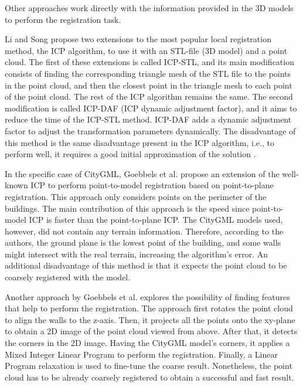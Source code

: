         Other approaches work directly with the information provided in the 3D models to perform the registration task.

        Li and Song \cite{Li_2015_amodified} propose two extensions to the most popular local registration method, the ICP algorithm, 
        to use it with an STL-file (3D model) and a point cloud.
        The first of these extensions is called ICP-STL, and its main modification consists of finding the corresponding triangle mesh of the STL file to the points 
        in the point cloud, and then the closest point in the triangle mesh to each point of the point cloud. The rest of the ICP algorithm remains the same.
        The second modification is called ICP-DAF (ICP dynamic adjustment factor), and it aims to reduce the time of the ICP-STL method. 
        ICP-DAF adds a dynamic adjustment factor to adjust the transformation parameters dynamically.
        The disadvantage of this method is the same disadvantage present in the ICP algorithm, 
        i.e., to perform well, it requires a good initial approximation of the solution \cite{Sakakubara_2007_automatic}.

        In the specific case of CityGML, Goebbels et al. \cite{Goebbels_2019_icpcitygml} propose an extension of the well-known ICP
        to perform point-to-model registration based on point-to-plane registration.
        This approach only considers points on the perimeter of the buildings.
        The main contribution of this approach is the speed since point-to-model ICP is faster than the point-to-plane ICP.
        The CityGML models used, however, did not contain any terrain information.
        Therefore, according to the authors, the ground plane is the lowest point of the building, and some walls might intersect with the real terrain, increasing the algorithm’s error.
        An additional disadvantage of this method is that it expects the point cloud to be coarsely registered with the model.

        Another approach by Goebbels et al. \cite{Goebbels_2018_alinear} explores the possibility of finding features that help to perform the registration.
        The approach first rotates the point cloud to align the walls to the z-axis. Then, it projects all the points onto the 
        xy-plane to obtain a 2D image of the point cloud viewed from above. After that, it detects the corners in the 2D image.
        Having the CityGML model’s corners, it applies a Mixed Integer Linear Program to perform the registration.
        Finally, a Linear Program relaxation is used to fine-tune the coarse result. 
        Nonetheless, the point cloud has to be already coarsely registered to obtain a successful and fast result.

